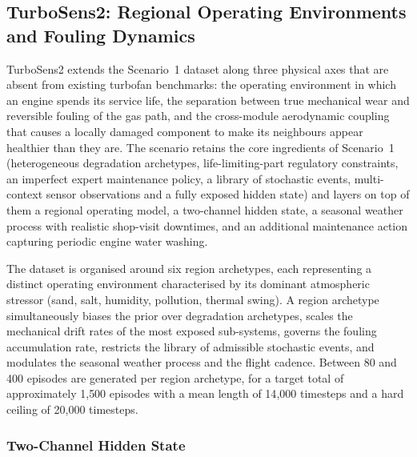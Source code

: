 
\subsection{TurboSens2: Regional Operating Environments and Fouling Dynamics}
\label{sec:dataset_scenario4}

TurboSens2 extends the Scenario~1 dataset along three physical axes that
are absent from existing turbofan benchmarks: the operating environment
in which an engine spends its service life, the separation between true
mechanical wear and reversible fouling of the gas path, and the
cross-module aerodynamic coupling that causes a locally damaged component
to make its neighbours appear healthier than they are. The scenario retains
the core ingredients of Scenario~1 (heterogeneous degradation archetypes,
life-limiting-part regulatory constraints, an imperfect expert maintenance
policy, a library of stochastic events, multi-context sensor observations
and a fully exposed hidden state) and layers on top of them a regional
operating model, a two-channel hidden state, a seasonal weather process
with realistic shop-visit downtimes, and an additional maintenance action
capturing periodic engine water washing.

The dataset is organised around six region archetypes, each representing
a distinct operating environment characterised by its dominant atmospheric
stressor (sand, salt, humidity, pollution, thermal swing). A region
archetype simultaneously biases the prior over degradation archetypes,
scales the mechanical drift rates of the most exposed sub-systems,
governs the fouling accumulation rate, restricts the library of
admissible stochastic events, and modulates the seasonal weather process
and the flight cadence. Between 80 and 400 episodes are generated per
region archetype, for a target total of approximately 1{,}500 episodes
with a mean length of 14{,}000 timesteps and a hard ceiling of 20{,}000
timesteps.

\subsubsection{Two-Channel Hidden State}
\label{sec:scen4_state}

